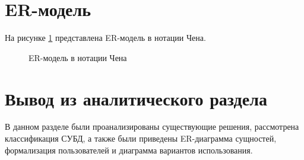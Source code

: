 \newpage
\section{ER-модель}
На рисунке \ref{er_model} представлена ER-модель в нотации Чена.
\begin{figure}[h!]
	\center{}
	\caption{ER-модель в нотации Чена}
	\label{er_model}
\end{figure}

\newpage
\section{Вывод из аналитического раздела}
В данном разделе были проанализированы существующие решения, рассмотрена классификация СУБД, а также были приведены ER-диаграмма сущностей, формализация пользователей и диаграмма вариантов использования.